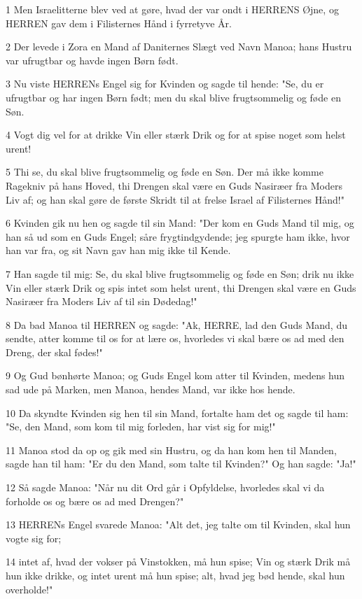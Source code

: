 \par 1 Men Israelitterne blev ved at gøre, hvad der var ondt i HERRENS Øjne, og HERREN gav dem i Filisternes Hånd i fyrretyve År.
\par 2 Der levede i Zora en Mand af Daniternes Slægt ved Navn Manoa; hans Hustru var ufrugtbar og havde ingen Børn født.
\par 3 Nu viste HERRENs Engel sig for Kvinden og sagde til hende: "Se, du er ufrugtbar og har ingen Børn født; men du skal blive frugtsommelig og føde en Søn.
\par 4 Vogt dig vel for at drikke Vin eller stærk Drik og for at spise noget som helst urent!
\par 5 Thi se, du skal blive frugtsommelig og føde en Søn. Der må ikke komme Ragekniv på hans Hoved, thi Drengen skal være en Guds Nasiræer fra Moders Liv af; og han skal gøre de første Skridt til at frelse Israel af Filisternes Hånd!"
\par 6 Kvinden gik nu hen og sagde til sin Mand: "Der kom en Guds Mand til mig, og han så ud som en Guds Engel; såre frygtindgydende; jeg spurgte ham ikke, hvor han var fra, og sit Navn gav han mig ikke til Kende.
\par 7 Han sagde til mig: Se, du skal blive frugtsommelig og føde en Søn; drik nu ikke Vin eller stærk Drik og spis intet som helst urent, thi Drengen skal være en Guds Nasiræer fra Moders Liv af til sin Dødedag!"
\par 8 Da bad Manoa til HERREN og sagde: "Ak, HERRE, lad den Guds Mand, du sendte, atter komme til os for at lære os, hvorledes vi skal bære os ad med den Dreng, der skal fødes!"
\par 9 Og Gud bønhørte Manoa; og Guds Engel kom atter til Kvinden, medens hun sad ude på Marken, men Manoa, hendes Mand, var ikke hos hende.
\par 10 Da skyndte Kvinden sig hen til sin Mand, fortalte ham det og sagde til ham: "Se, den Mand, som kom til mig forleden, har vist sig for mig!"
\par 11 Manoa stod da op og gik med sin Hustru, og da han kom hen til Manden, sagde han til ham: "Er du den Mand, som talte til Kvinden?" Og han sagde: "Ja!"
\par 12 Så sagde Manoa: "Når nu dit Ord går i Opfyldelse, hvorledes skal vi da forholde os og bære os ad med Drengen?"
\par 13 HERRENs Engel svarede Manoa: "Alt det, jeg talte om til Kvinden, skal hun vogte sig for;
\par 14 intet af, hvad der vokser på Vinstokken, må hun spise; Vin og stærk Drik må hun ikke drikke, og intet urent må hun spise; alt, hvad jeg bød hende, skal hun overholde!"
